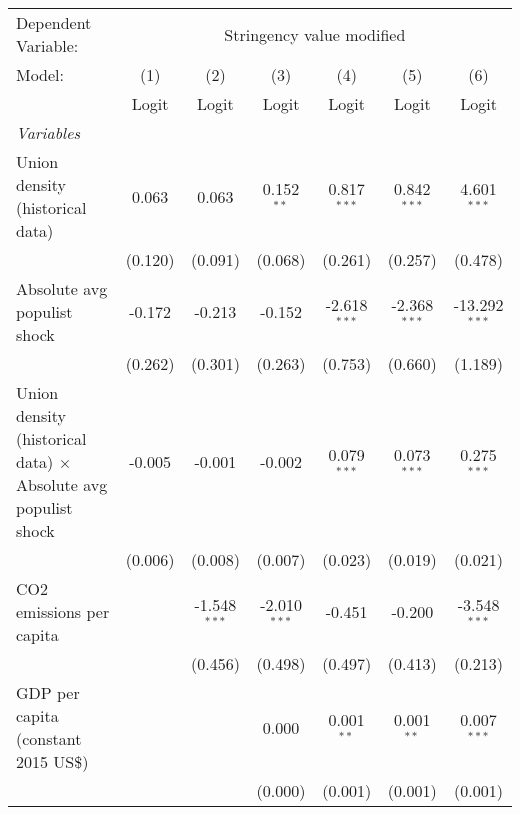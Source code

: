 
\begingroup
\centering
\begin{tabular}{lcccccc}
   \toprule
   Dependent Variable: & \multicolumn{6}{c}{Stringency value modified}\\
   Model:                                                                & (1)     & (2)            & (3)            & (4)            & (5)            & (6)\\  
                                                                         &  Logit  & Logit          & Logit          & Logit          & Logit          & Logit\\  
   \midrule
   \emph{Variables}\\
   Union density (historical data)                                       & 0.063   & 0.063          & 0.152$^{**}$   & 0.817$^{***}$  & 0.842$^{***}$  & 4.601$^{***}$\\   
                                                                         & (0.120) & (0.091)        & (0.068)        & (0.261)        & (0.257)        & (0.478)\\   
   Absolute avg populist shock                                           & -0.172  & -0.213         & -0.152         & -2.618$^{***}$ & -2.368$^{***}$ & -13.292$^{***}$\\   
                                                                         & (0.262) & (0.301)        & (0.263)        & (0.753)        & (0.660)        & (1.189)\\   
   Union density (historical data) $\times$ Absolute avg populist shock  & -0.005  & -0.001         & -0.002         & 0.079$^{***}$  & 0.073$^{***}$  & 0.275$^{***}$\\   
                                                                         & (0.006) & (0.008)        & (0.007)        & (0.023)        & (0.019)        & (0.021)\\   
   CO2 emissions per capita                                              &         & -1.548$^{***}$ & -2.010$^{***}$ & -0.451         & -0.200         & -3.548$^{***}$\\   
                                                                         &         & (0.456)        & (0.498)        & (0.497)        & (0.413)        & (0.213)\\   
   GDP per capita (constant 2015 US\$)                                   &         &                & 0.000          & 0.001$^{**}$   & 0.001$^{**}$   & 0.007$^{***}$\\   
                                                                         &         &                & (0.000)        & (0.001)        & (0.001)        & (0.001)\\   

\end{tabular}
